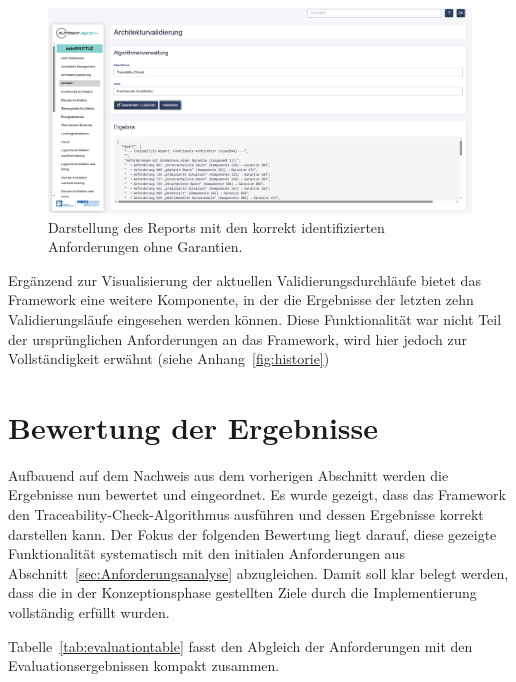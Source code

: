 \begin{figure}[htp!]
  \centering
  \includegraphics[width=\textwidth]{figures/06Evaluation/Bildschirmfoto vom 2025-06-30 09-17-02.png}
  \caption{Darstellung des Reports mit den korrekt identifizierten Anforderungen ohne Garantien.}
  \label{fig:valresult}
\end{figure}

Ergänzend zur Visualisierung der aktuellen Validierungsdurchläufe bietet das Framework eine weitere Komponente, in der die Ergebnisse der letzten zehn Validierungsläufe eingesehen werden können. Diese Funktionalität war nicht Teil der ursprünglichen Anforderungen an das Framework, wird hier jedoch zur Vollständigkeit erwähnt (siehe Anhang~\ref{fig:historie})

\section{Bewertung der Ergebnisse}
\label{sec:analyse}

Aufbauend auf dem Nachweis aus dem vorherigen Abschnitt werden die Ergebnisse nun bewertet und eingeordnet. Es wurde gezeigt, dass das Framework den Traceability-Check-Algorithmus ausführen und dessen Ergebnisse korrekt darstellen kann. Der Fokus der folgenden Bewertung liegt darauf, diese gezeigte Funktionalität systematisch mit den initialen Anforderungen aus Abschnitt~\ref{sec:Anforderungsanalyse} abzugleichen. Damit soll klar belegt werden, dass die in der Konzeptionsphase gestellten Ziele durch die Implementierung vollständig erfüllt wurden.

Tabelle~\ref{tab:evaluationtable} fasst den Abgleich der Anforderungen mit den Evaluationsergebnissen kompakt zusammen.

